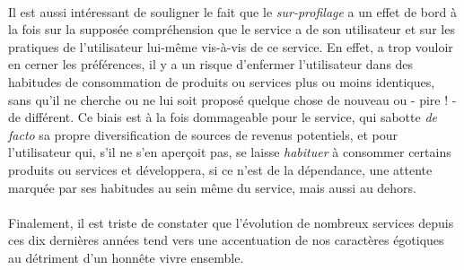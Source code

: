 \paragraph{} Il est aussi intéressant de souligner le fait que le \emph{sur-profilage} a un effet de bord à la fois sur
la supposée compréhension que le service a de son utilisateur et sur les pratiques de l'utilisateur lui-même vis-à-vis 
de ce service. En effet, a trop vouloir en cerner les préférences, il y a un risque d'enfermer l'utilisateur dans des
habitudes de consommation de produits ou services plus ou moins identiques, sans qu'il ne cherche ou ne lui soit proposé
quelque chose de nouveau ou - pire ! - de différent. Ce biais est à la fois dommageable pour le service, qui sabotte
\emph{de facto} sa propre diversification de sources de revenus potentiels, et pour l'utilisateur qui, s'il ne s'en 
aperçoit pas, se laisse \emph{habituer} à consommer certains produits ou services et développera, si ce n'est de la 
dépendance, une attente marquée par ses habitudes au sein même du service, mais aussi au dehors.

\paragraph{} Finalement, il est triste de constater que l'évolution de nombreux services depuis ces dix dernières années
tend vers une accentuation de nos caractères égotiques au détriment d'un honnête vivre ensemble.